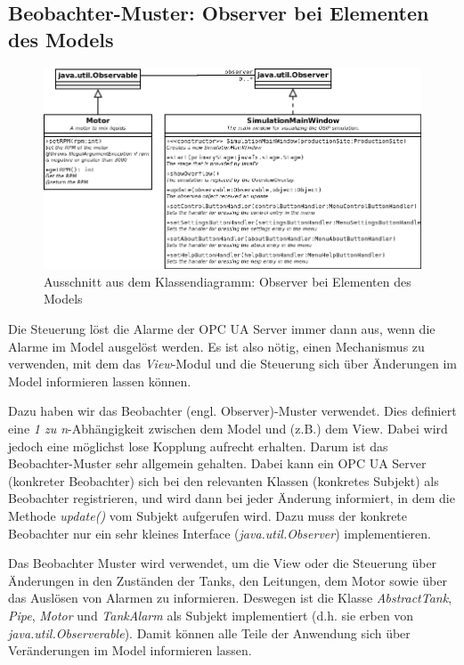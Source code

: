 \documentclass[parskip=full]{scrartcl}
\begin{document}
\subsection{Beobachter-Muster: Observer bei Elementen des Models}
\begin{figure}[H]
  \centering
  \includegraphics[scale=0.35]{design/pattern-screenshots/observer-Model.png}
  \caption{Ausschnitt aus dem Klassendiagramm: Observer bei Elementen des Models}
\end{figure}
Die Steuerung löst die Alarme der OPC UA Server immer dann aus, wenn die Alarme im Model
ausgelöst werden. Es ist also nötig, einen Mechanismus zu verwenden, mit dem das \emph{View}-Modul und die Steuerung sich über Änderungen im Model informieren
lassen können.

Dazu haben wir das Beobachter (engl. Observer)-Muster verwendet. Dies definiert eine \emph{1 zu n}-Abhängigkeit zwischen dem Model und (z.B.) dem View.
Dabei wird jedoch eine möglichst lose Kopplung aufrecht erhalten. Darum ist das Beobachter-Muster sehr allgemein gehalten. Dabei kann ein OPC UA Server (konkreter Beobachter)
sich bei den relevanten Klassen (konkretes Subjekt) als Beobachter registrieren, und wird dann bei jeder Änderung informiert, in dem die Methode \emph{update()}
vom Subjekt aufgerufen wird. Dazu muss der konkrete Beobachter nur ein sehr kleines Interface (\emph{java.util.Observer}) implementieren.

Das Beobachter Muster wird verwendet, um die View oder die Steuerung über Änderungen in den Zuständen der Tanks, den Leitungen, dem Motor sowie über
das Auslösen von Alarmen zu informieren. Deswegen ist die Klasse \emph{AbstractTank}, \emph{Pipe}, \emph{Motor} und \emph{TankAlarm} als Subjekt implementiert
(d.h. sie erben von \emph{java.util.Observerable}). Damit können alle Teile der Anwendung sich über Veränderungen im Model informieren lassen.
\end{document}
